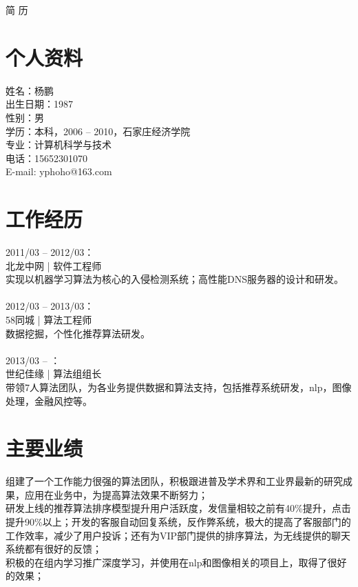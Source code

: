 \documentclass[11pt, a4paper]{article}
\begin{document}
\begin{center}
    \Huge{简{ }{ }历}       %
\end{center}





\section*{个人资料}         %

姓名：杨鹏 \\
出生日期：1987 \\
性别：男 \\
学历：本科，2006 -- 2010，石家庄经济学院 \\
专业：计算机科学与技术 \\
电话：\mbox{15652301070} \\
E-mail: yphoho@163.com \\






\section*{工作经历}

2011/03 -- 2012/03： \\
北龙中网 | 软件工程师 \\
实现以机器学习算法为核心的入侵检测系统；高性能DNS服务器的设计和研发。 \\
\\
2012/03 -- 2013/03： \\
58同城 | 算法工程师 \\
数据挖掘，个性化推荐算法研发。 \\
\\
2013/03 -- ： \\
世纪佳缘 | 算法组组长 \\
带领7人算法团队，为各业务提供数据和算法支持，包括推荐系统研发，nlp，图像处理，金融风控等。 \\





\section*{主要业绩}

组建了一个工作能力很强的算法团队，积极跟进普及学术界和工业界最新的研究成果，应用在业务中，为提高算法效果不断努力； \\
研发上线的推荐算法排序模型提升用户活跃度，发信量相较之前有40\%提升，点击提升90\%以上；开发的客服自动回复系统，反作弊系统，极大的提高了客服部门的工作效率，减少了用户投诉；还有为VIP部门提供的排序算法，为无线提供的聊天系统都有很好的反馈； \\
积极的在组内学习推广深度学习，并使用在nlp和图像相关的项目上，取得了很好的效果； \\
\end{document}
